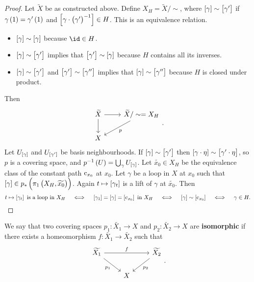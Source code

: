 \begin{proof}
Let $ \widetilde{X} $ be as constructed above. Define $ X_H = \widetilde{X} / \sim $, where $ \sbr{\gamma} \sim \sbr{\gamma'} $ if $ \gamma\br{1} = \gamma'\br{1} $ and $ \sbr{\gamma \cdot \br{\gamma'}^{-1}} \in H $. This is an equivalence relation.
\begin{itemize}
\item $ \sbr{\gamma} \sim \sbr{\gamma} $ because $ \id \in H $.
\item $ \sbr{\gamma} \sim \sbr{\gamma'} $ implies that $ \sbr{\gamma'} \sim \sbr{\gamma} $ because $ H $ contains all its inverses.
\item $ \sbr{\gamma} \sim \sbr{\gamma'} $ and $ \sbr{\gamma'} \sim \sbr{\gamma''} $ implies that $ \sbr{\gamma} \sim \sbr{\gamma''} $ because $ H $ is closed under product.
\end{itemize}
Then
$$
\begin{tikzcd}
\widetilde{X} \arrow{r} \arrow{d} & \widetilde{X} / \sim = X_H \arrow{dl}{p} \\
X &
\end{tikzcd}.
$$
Let $ U_{\sbr{\gamma}} $ and $ U_{\sbr{\gamma'}} $ be basis neighbourhoods. If $ \sbr{\gamma} \sim \sbr{\gamma'} $ then $ \sbr{\gamma \cdot \eta} \sim \sbr{\gamma' \cdot \eta} $, so $ p $ is a covering space, and $ p^{-1}\br{U} = \bigcup_\gamma U_{\sbr{\gamma}} $. Let $ \widetilde{x_0} \in X_H $ be the equivalence class of the constant path $ \mathrm{c}_{x_0} $ at $ x_0 $. Let $ \gamma $ be a loop in $ X $ at $ x_0 $ such that $ \sbr{\gamma} \in p_*\br{\pi_1\br{X_H, \widetilde{x_0}}} $. Again $ t \mapsto \sbr{\gamma_t} $ is a lift of $ \gamma $ at $ \widetilde{x_0} $. Then
$$ t \mapsto \sbr{\gamma_t} \ \text{is a loop in} \ X_H \quad \iff \quad \sbr{\gamma_1} = \sbr{\gamma} = \sbr{\c_{x_0}} \ \text{in} \ X_H \quad \iff \quad \sbr{\gamma} \sim \sbr{\c_{x_0}} \quad \iff \quad \gamma \in H. $$
\end{proof}

\begin{definition*}
We say that two covering spaces $ p_1 : \widetilde{X_1} \to X $ and $ p_2 : \widetilde{X_2} \to X $ are \textbf{isomorphic} if there exists a homeomorphism $ f : \widetilde{X_1} \to \widetilde{X_2} $ such that
$$
\begin{tikzcd}
\widetilde{X_1} \arrow{rr}{f} \arrow{dr}[swap]{p_1} & & \widetilde{X_2} \arrow{dl}{p_2} \\
& X &
\end{tikzcd}.
$$
\end{definition*}

